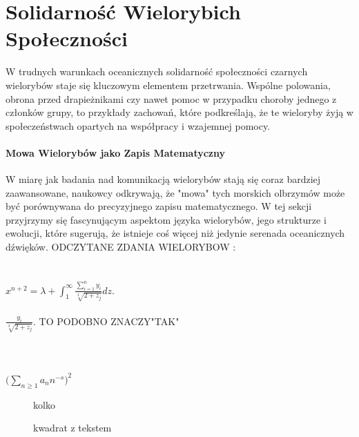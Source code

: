 \documentclass{article}
\begin{document}
\section{Solidarność Wielorybich Społeczności}
W trudnych warunkach oceanicznych solidarność społeczności czarnych wielorybów staje się kluczowym elementem przetrwania. Wspólne polowania, obrona przed drapieżnikami czy nawet pomoc w przypadku choroby jednego z członków grupy, to przykłady zachowań, które podkreślają, że te wieloryby żyją w społeczeństwach opartych na współpracy i wzajemnej pomocy.
\paragraph{Mowa Wielorybów jako Zapis Matematyczny}
W miarę jak badania nad komunikacją wielorybów stają się coraz bardziej zaawansowane, naukowcy odkrywają, że "mowa" tych morskich olbrzymów może być porównywana do precyzyjnego zapisu matematycznego. W tej sekcji przyjrzymy się fascynującym aspektom języka wielorybów, jego strukturze i ewolucji, które sugerują, że istnieje coś więcej niż jedynie serenada oceanicznych dźwięków.
\newline
\large{ODCZYTANE ZDANIA WIELORYBOW : }\\
\\\\
$x^{n + 2} = \lambda + \int_{1}^{\infty} \frac{\sum_{i=1}^{n} y_{i}}{\sqrt[3]{2 + z_{j}}} dz.$
\\\\
$ \frac{y_{i}}{\sqrt[3]{2 + z_{j}}}.$ \footnotesize{      TO PODOBNO ZNACZY}"TAK"
\\\\\\\\
$\biggl(\sum_{n\ge 1} a_{n} n^{-s}\biggr)^2$


\begin{figure}[h]
  \centering
  \caption{kolko \cite{autor1}}
  \label{fig:rysunek}
\end{figure}

\begin{figure}[h]
  \centering
  \caption{kwadrat z tekstem \cite{autor2}}
  \label{fig:rysunek-tekst}
\end{figure}
\end{document}
